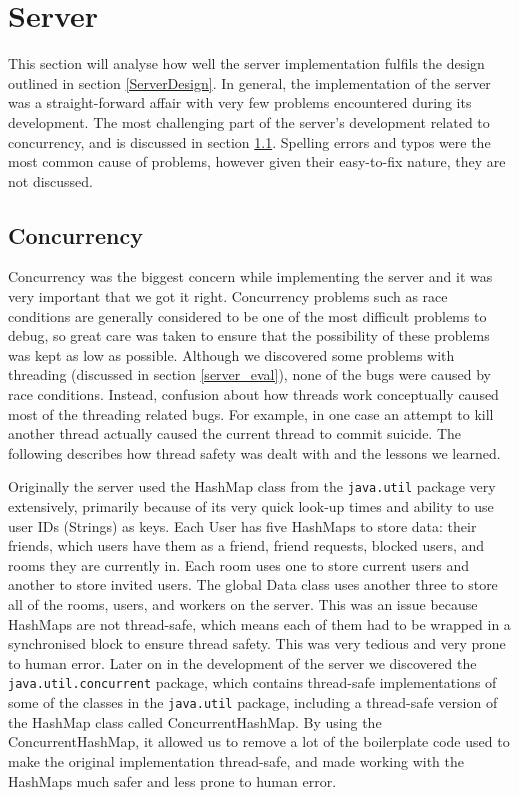 \section{Server}

This section will analyse how well the server implementation fulfils the design outlined in section \ref{ServerDesign}. In general, the implementation of the server was a straight-forward affair with very few problems encountered during its development. The most challenging part of the server's development related to concurrency, and is discussed in section \ref{concur}. Spelling errors and typos were the most common cause of problems, however given their easy-to-fix nature, they are not discussed.

\subsection{Concurrency}
\label{concur}
Concurrency was the biggest concern while implementing the server and it was very important that we got it right. Concurrency problems such as race conditions are generally considered to be one of the most difficult problems to debug, so great care was taken to ensure that the possibility of these problems was kept as low as possible. Although we discovered some problems with threading (discussed in section \ref{server_eval}), none of the bugs were caused by race conditions. Instead, confusion about how threads work conceptually caused most of the threading related bugs. For example, in one case an attempt to kill another thread actually caused the current thread to commit suicide. The following describes how thread safety was dealt with and the lessons we learned.

Originally the server used the HashMap class from the \texttt{java.util} package very extensively, primarily because of its very quick look-up times and ability to use user IDs (Strings) as keys. Each User has five HashMaps to store data: their friends, which users have them as a friend, friend requests, blocked users, and rooms they are currently in. Each room uses one to store current users and another to store invited users. The global Data class uses another three to store all of the rooms, users, and workers on the server. This was an issue because HashMaps are not thread-safe, which means each of them had to be wrapped in a synchronised block to ensure thread safety. This was very tedious and very prone to human error. Later on in the development of the server we discovered the \texttt{java.util.concurrent} package, which contains thread-safe implementations of some of the classes in the \texttt{java.util} package, including a thread-safe version of the HashMap class called ConcurrentHashMap. By using the ConcurrentHashMap, it allowed us to remove a lot of the boilerplate code used to make the original implementation thread-safe, and made working with the HashMaps much safer and less prone to human error.

